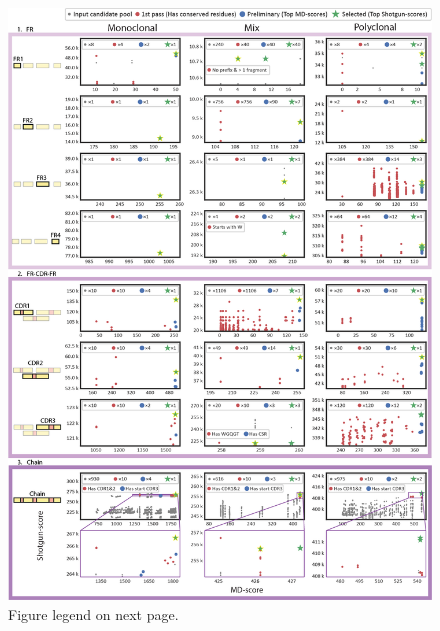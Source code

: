 \begin{subappendices}
  \begin{figure}[!pt]
    \center
    \includegraphics[]{Chapter.5/Figures/fs3.png}
    \captionsetup{singlelinecheck = false, format= hang}
    \caption{
      Figure legend on next page.
    }
    \label{fig:figs5.3}
  \end{figure}
  \addtocounter{figure}{-1}
  \begin{figure}[!ht]

\end{figure}
\end{subappendices}
